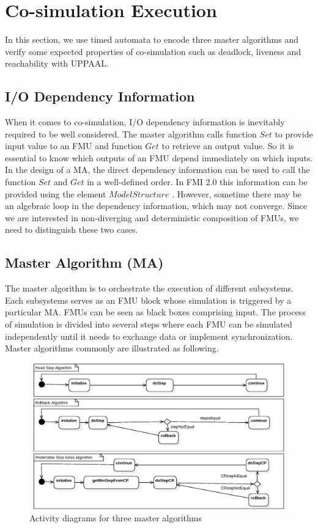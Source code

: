 \section{Co-simulation Execution}
\label{sec:ma}
In this section, we use timed automata to encode three master algorithms and verify some expected properties of co-simulation such as deadlock, liveness and reachability with UPPAAL.
\subsection{I/O Dependency Information}
When it comes to co-simulation, I/O dependency information \cite{BromanBGLMTW13} is inevitably required to be well considered. The master algorithm calls function $Set$ to provide input value to an FMU and function $Get$ to retrieve an output value. So it is essential to know which outputs of an FMU depend immediately on which inputs. In the design of a MA, the direct dependency information can be used to call the function $Set$ and $Get$ in a well-defined order. In FMI 2.0 this information can be provided using the element $ModelStructure$ \cite{FMI2INTRO}. However, sometime there may be an algebraic loop in the dependency information, which may not converge. Since we are interested in non-diverging and deterministic composition of FMUs, we need to distinguish these two cases. 
\subsection{Master Algorithm (MA)}
The master algorithm is to orchestrate the execution of different subsystems. Each subsystems serves as an FMU block whose simulation is triggered by a particular MA. FMUs can be seen as black boxes comprising input. The process of simulation is divided into several steps where each FMU can be simulated independently until it needs to exchange data or implement synchronization. Master algorithms commonly are illustrated as following.
\begin{figure}[htbp]
\begin{center}
\includegraphics[width=5.0in,height=2.5in]{fig/MA.jpg}
\caption{Activity diagrams for three master algorithms}
\label{ad-fixedstep}
\end{center}
\end{figure}
